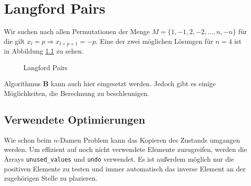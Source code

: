 \chapter{Langford Pairs}
Wir suchen nach allen Permutationen der Menge $M = \{1, -1, 2, -2, \dots, n, -n\}$ für die gilt $x_l = p \Rightarrow x_{l+p+1} = -p$.
Eine der zwei möglichen Lösungen für $n = 4$ ist in Abbildung \ref{langford} zu sehen.
\begin{figure}
  \centering
  
  \caption{{Langford Pairs \cite{WikipediaEN:LFP}}}
  \label{langford}
\end{figure}
Algorithmus \textbf{B} kann auch hier eingesetzt werden\cite[{src/langford.rs}]{Kauschke}. Jedoch gibt es einige
Möglichkeiten, die Berechnung zu beschleunigen.

\section{Verwendete Optimierungen}
Wie schon beim $n$-Damen Problem kann das Kopieren des Zustands umgangen werden. Um effizient auf noch nicht
verwendete Elemente zuzugreifen, werden die Arrays \texttt{unused_values} und \texttt{undo} verwendet.
Es ist außerdem möglich nur die positiven Elemente zu testen und immer automatisch das inverse Element an der zugehörigen Stelle zu
plazieren.

